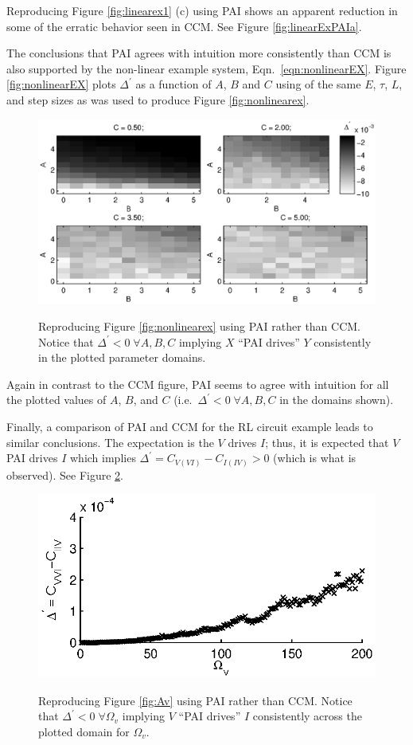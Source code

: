 \documentclass[twocolumn,aps,pre,groupedaddress]{revtex4-1}
\begin{document}
Reproducing Figure \ref{fig:linearex1} (c) using PAI shows an apparent reduction in some of the erratic behavior seen in CCM.  See Figure \ref{fig:linearExPAIa}.

The conclusions that PAI agrees with intuition more consistently than CCM is also supported by the non-linear example system, Eqn.\ \ref{eqn:nonlinearEX}.  Figure \ref{fig:nonlinearEX} plots $\Delta^\prime$ as a function of $A$, $B$ and $C$ using of the same $E$, $\tau$, $L$, and step sizes as was used to produce Figure \ref{fig:nonlinearex}.
\begin{figure}[ht]
\includegraphics[scale=0.55]{NonLinearPAIEx.eps} \\
\caption{Reproducing Figure \ref{fig:nonlinearex} using PAI rather than CCM.  Notice that $\Delta^\prime<0\;\forall A,B,C$ implying $X$ ``PAI drives'' $Y$ consistently in the plotted parameter domains.}
\label{fig:nonlinearEXPAI}
\end{figure}
Again in contrast to the CCM figure, PAI seems to agree with intuition for all the plotted values of $A$, $B$, and $C$ (i.e.\ $\Delta^\prime<0\;\forall A,B,C$ in the domains shown).

Finally, a comparison of PAI and CCM for the RL circuit example leads to similar conclusions.  The expectation is the $V$ drives $I$; thus, it is expected that $V$ PAI drives $I$ which implies $\Delta^\prime = C_{V(VI)} - C_{I(IV)} > 0$ (which is what is observed).  See Figure \ref{fig:AvPAI}.
\begin{figure}[ht]
\includegraphics[scale=0.9]{RLCircuitVaryV_FreqPAI.eps} \\
\caption{Reproducing Figure \ref{fig:Av} using PAI rather than CCM.  Notice that $\Delta^\prime<0\;\forall \Omega_v$ implying $V$ ``PAI drives'' $I$ consistently across the plotted domain for $\Omega_v$.}
\label{fig:AvPAI}
\end{figure}
\end{document}
